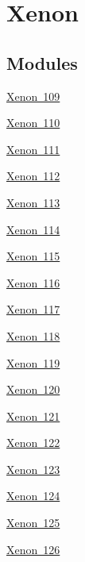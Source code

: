\hypertarget{group___isotope_const-_xenon}{}\section{Xenon}
\label{group___isotope_const-_xenon}
\subsection*{Modules}
\begin{DoxyCompactItemize}
\item 
\mbox{\hyperlink{group___isotope_const-_xenon-_xe109}{Xenon 109}}
\item 
\mbox{\hyperlink{group___isotope_const-_xenon-_xe110}{Xenon 110}}
\item 
\mbox{\hyperlink{group___isotope_const-_xenon-_xe111}{Xenon 111}}
\item 
\mbox{\hyperlink{group___isotope_const-_xenon-_xe112}{Xenon 112}}
\item 
\mbox{\hyperlink{group___isotope_const-_xenon-_xe113}{Xenon 113}}
\item 
\mbox{\hyperlink{group___isotope_const-_xenon-_xe114}{Xenon 114}}
\item 
\mbox{\hyperlink{group___isotope_const-_xenon-_xe115}{Xenon 115}}
\item 
\mbox{\hyperlink{group___isotope_const-_xenon-_xe116}{Xenon 116}}
\item 
\mbox{\hyperlink{group___isotope_const-_xenon-_xe117}{Xenon 117}}
\item 
\mbox{\hyperlink{group___isotope_const-_xenon-_xe118}{Xenon 118}}
\item 
\mbox{\hyperlink{group___isotope_const-_xenon-_xe119}{Xenon 119}}
\item 
\mbox{\hyperlink{group___isotope_const-_xenon-_xe120}{Xenon 120}}
\item 
\mbox{\hyperlink{group___isotope_const-_xenon-_xe121}{Xenon 121}}
\item 
\mbox{\hyperlink{group___isotope_const-_xenon-_xe122}{Xenon 122}}
\item 
\mbox{\hyperlink{group___isotope_const-_xenon-_xe123}{Xenon 123}}
\item 
\mbox{\hyperlink{group___isotope_const-_xenon-_xe124}{Xenon 124}}
\item 
\mbox{\hyperlink{group___isotope_const-_xenon-_xe125}{Xenon 125}}
\item 
\mbox{\hyperlink{group___isotope_const-_xenon-_xe126}{Xenon 126}}
\item 

\end{DoxyCompactItemize}
